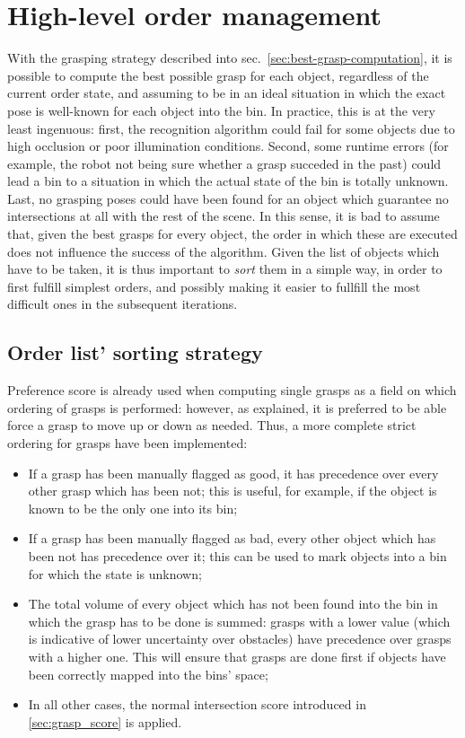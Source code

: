 \section{High-level order management} \label{sec:order-list}
With the grasping strategy described into
sec.~\ref{sec:best-grasp-computation}, it is possible to compute the
best possible grasp for each object, regardless of the current order
state, and assuming to be in an ideal situation in which the exact
pose is well-known for each object into the bin. In practice, this is
at the very least ingenuous: first, the recognition algorithm could
fail for some objects due to high occlusion or poor illumination
conditions. Second, some runtime errors (for example, the robot not
being sure whether a grasp succeded in the past) could lead a bin to a
situation in which the actual state of the bin is totally
unknown. Last, no grasping poses could have been found for an object
which guarantee no intersections at all with the rest of the scene. In
this sense, it is bad to assume that, given the best grasps for every
object, the order in which these are executed does not influence the
success of the algorithm. Given the list of objects which have to be
taken, it is thus important to \emph{sort} them in a simple way, in
order to first fulfill simplest orders, and possibly making it easier
to fullfill the most difficult ones in the subsequent iterations.

\subsection{Order list' sorting strategy} \label{sec:sort-order}
Preference score is already used when computing single grasps as a field on which ordering of
grasps is performed: however, as explained, it is preferred to be able
force a grasp to move up or down as needed. Thus, a more complete strict
ordering for grasps have been implemented:
\begin{itemize}
\item {If a grasp has been manually flagged as good, it has
  precedence over every other grasp which has been not; this is
  useful, for example, if the object is known to be the only one into
  its bin;}
\item{If a grasp has been manually flagged as bad, every other object
  which has been not has precedence over it; this can be used to mark
  objects into a bin for which the state is unknown;}
\item{The total volume of every object which has not been found into
  the bin in which the grasp has to be done is summed: grasps with a
  lower value (which is indicative of lower uncertainty over
  obstacles) have precedence over grasps with a higher one. This
  will ensure that grasps are done first if objects have been
  correctly mapped into the bins' space;}
\item{In all other cases, the normal intersection score introduced
  in \ref{sec:grasp_score} is applied.}
\end{itemize}

